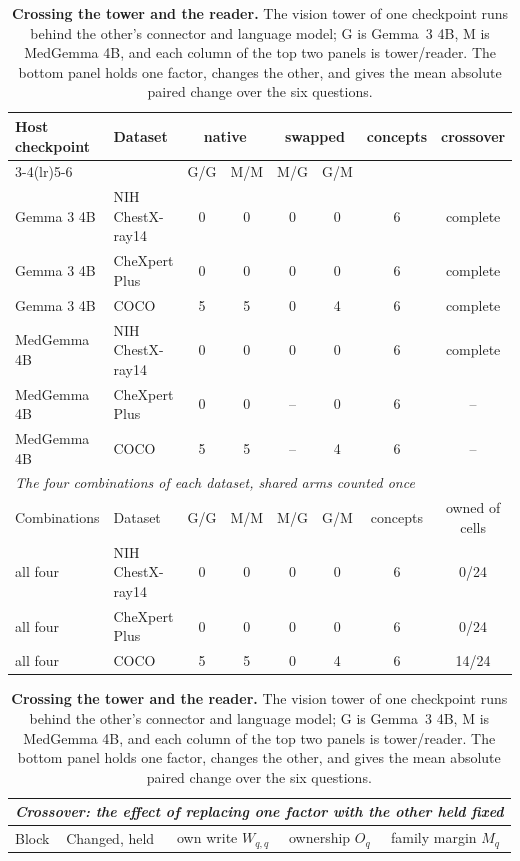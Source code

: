 \begin{table}[htbp]
\centering
\scriptsize
\setlength{\tabcolsep}{4pt}
\caption{\textbf{Crossing the tower and the reader.} The vision tower of one checkpoint runs behind the other's connector and language model; G is Gemma~3 4B, M is MedGemma 4B, and each column of the top two panels is tower/reader. The bottom panel holds one factor, changes the other, and gives the mean absolute paired change over the six questions.}
\label{tab:cf-towerswap}
\begin{tabular}{llcccccc}
\toprule
\multirow{2}{*}{Host checkpoint} & \multirow{2}{*}{Dataset} & \multicolumn{2}{c}{native} & \multicolumn{2}{c}{swapped} & \multirow{2}{*}{concepts} & \multirow{2}{*}{crossover}\\
\cmidrule(lr){3-4}\cmidrule(lr){5-6}
&  & \multicolumn{1}{c}{G/G} & \multicolumn{1}{c}{M/M} & \multicolumn{1}{c}{M/G} & \multicolumn{1}{c}{G/M} &  & \\
\midrule
Gemma 3 4B & NIH ChestX-ray14 & 0 & 0 & 0 & 0 & 6 & complete \\
Gemma 3 4B & CheXpert Plus & 0 & 0 & 0 & 0 & 6 & complete \\
Gemma 3 4B & COCO & 5 & 5 & 0 & 4 & 6 & complete \\
MedGemma 4B & NIH ChestX-ray14 & 0 & 0 & 0 & 0 & 6 & complete \\
MedGemma 4B & CheXpert Plus & 0 & 0 & -- & 0 & 6 & -- \\
MedGemma 4B & COCO & 5 & 5 & -- & 4 & 6 & -- \\
\midrule
\multicolumn{8}{l}{\textit{The four combinations of each dataset, shared arms counted once}} \\
Combinations & Dataset & G/G & M/M & M/G & G/M & concepts & owned of cells \\
\midrule
all four & NIH ChestX-ray14 & 0 & 0 & 0 & 0 & 6 & 0/24 \\
all four & CheXpert Plus & 0 & 0 & 0 & 0 & 6 & 0/24 \\
all four & COCO & 5 & 5 & 0 & 4 & 6 & 14/24 \\
\bottomrule
\end{tabular}
\vspace{4pt}
\setlength{\tabcolsep}{2.5pt}
\begin{tabular}{llccc}
\toprule
\multicolumn{5}{l}{\textit{Crossover: the effect of replacing one factor with the other held fixed}} \\
\midrule
Block & Changed, held & own write $W_{q,q}$ & ownership $O_q$ & family margin $M_q$ \\

\end{tabular}
\end{table}
